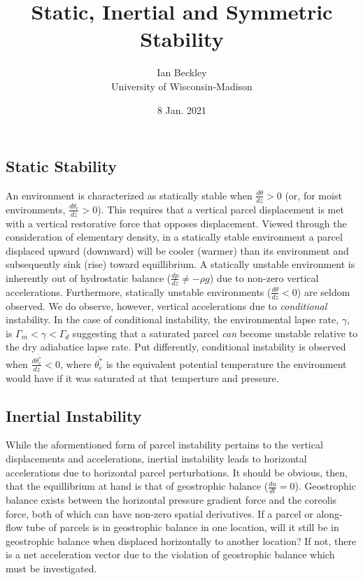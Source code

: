 \documentclass[a4paper,12pt]{article}
\begin{document}
\title{\vspace{-4.0cm} Static, Inertial and Symmetric Stability}
\author{Ian Beckley
\\University of Wisconsin-Madison}

\date{8 Jan. 2021}

\maketitle

\subsection*{Static Stability}

An environment is characterized as statically stable when $\frac{d\theta}{dz} > 0$ (or, for moist environments, $\frac{d\theta_e}{dz} > 0$). This requires that a vertical parcel displacement is met with a vertical restorative force that opposes displacement. Viewed through the consideration of elementary density, in a statically stable environment a parcel displaced upward (downward) will be cooler (warmer) than its environment and subsequently sink (rise) toward equillibrium. A statically unstable environment is inherently out of hydrostatic balance ($\frac{dp}{dz} \neq -\rho g$) due to non-zero vertical accelerations. Furthermore, statically unstable environments ($\frac{d\theta}{dz} < 0$) are seldom observed. We do observe, however, vertical accelerations due to \emph{conditional} instability. In the case of conditional instability, the environmental lapse rate, $\gamma$, is $\Gamma_m < \gamma < \Gamma_d$ suggesting that a saturated parcel  \emph{can} become unstable relative to the dry adiabatice lapse rate. Put differently, conditional instability is observed when $\frac{d\overline{\theta_e^*}}{dz} < 0$, where $\overline{\theta_e^*}$ is the equivalent potential temperature the environment would have if it was saturated at that temperture and pressure.

\subsection*{Inertial Instability}
While the aformentioned form of parcel instability pertains to the vertical displacements and accelerations, inertial instability leads to horizontal accelerations due to horizontal parcel perturbations. It should be obvious, then, that the equillibrium at hand is that of geostrophic balance ($\frac{du}{dt} = 0$). Geostrophic balance exists between the horizontal pressure gradient force and the coreolis force, both of which can have non-zero spatial derivatives. If a parcel or along-flow tube of parcels is in geostrophic balance in one location, will it still be in geostrophic balance when displaced horizontally to another location? If not, there is a net acceleration vector due to the violation of geostrophic balance which must be investigated. 
\end{document}
